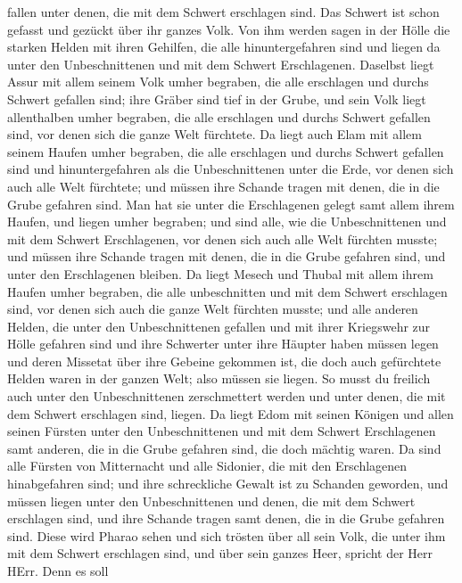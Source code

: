 fallen unter denen, die mit dem Schwert erschlagen sind. Das Schwert ist
schon gefasst und gezückt über ihr ganzes Volk.  Von ihm
werden sagen in der Hölle die starken Helden mit ihren Gehilfen, die
alle hinuntergefahren sind und liegen da unter den Unbeschnittenen und
mit dem Schwert Erschlagenen.  Daselbst liegt Assur mit
allem seinem Volk umher begraben, die alle erschlagen und durchs Schwert
gefallen sind;  ihre Gräber sind tief in der Grube, und
sein Volk liegt allenthalben umher begraben, die alle erschlagen und
durchs Schwert gefallen sind, vor denen sich die ganze Welt fürchtete.
 Da liegt auch Elam mit allem seinem Haufen umher begraben,
die alle erschlagen und durchs Schwert gefallen sind und
hinuntergefahren als die Unbeschnittenen unter die Erde, vor denen sich
auch alle Welt fürchtete; und müssen ihre Schande tragen mit denen, die
in die Grube gefahren sind.  Man hat sie unter die
Erschlagenen gelegt samt allem ihrem Haufen, und liegen umher begraben;
und sind alle, wie die Unbeschnittenen und mit dem Schwert Erschlagenen,
vor denen sich auch alle Welt fürchten musste; und müssen ihre Schande
tragen mit denen, die in die Grube gefahren sind, und unter den
Erschlagenen bleiben.  Da liegt Mesech und Thubal mit allem
ihrem Haufen umher begraben, die alle unbeschnitten und mit dem Schwert
erschlagen sind, vor denen sich auch die ganze Welt fürchten musste;
 und alle anderen Helden, die unter den Unbeschnittenen
gefallen und mit ihrer Kriegswehr zur Hölle gefahren sind und ihre
Schwerter unter ihre Häupter haben müssen legen und deren Missetat über
ihre Gebeine gekommen ist, die doch auch gefürchtete Helden waren in der
ganzen Welt; also müssen sie liegen.  So musst du freilich
auch unter den Unbeschnittenen zerschmettert werden und unter denen, die
mit dem Schwert erschlagen sind, liegen.  Da liegt Edom mit
seinen Königen und allen seinen Fürsten unter den Unbeschnittenen und
mit dem Schwert Erschlagenen samt anderen, die in die Grube gefahren
sind, die doch mächtig waren.  Da sind alle Fürsten von
Mitternacht und alle Sidonier, die mit den Erschlagenen hinabgefahren
sind; und ihre schreckliche Gewalt ist zu Schanden geworden, und müssen
liegen unter den Unbeschnittenen und denen, die mit dem Schwert
erschlagen sind, und ihre Schande tragen samt denen, die in die Grube
gefahren sind.  Diese wird Pharao sehen und sich trösten
über all sein Volk, die unter ihm mit dem Schwert erschlagen sind, und
über sein ganzes Heer, spricht der Herr HErr.  Denn es soll
